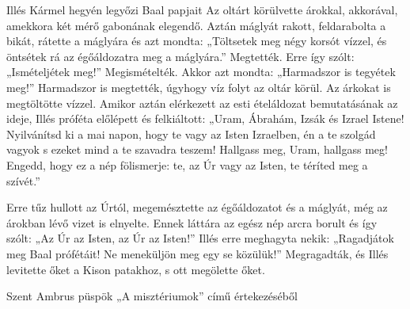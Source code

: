 \documentclass[twoside]{article}
\begin{document}
\begin{lectio}{Illés Kármel hegyén legyőzi Baal papjait}
Az oltárt körülvette árokkal, akkorával, amekkora két mérő gabonának elegendő. Aztán máglyát rakott, feldarabolta a bikát, rátette a máglyára és azt mondta: „Töltsetek meg négy korsót vízzel, és öntsétek rá az égőáldozatra meg a máglyára.” Megtették. Erre így szólt: „Ismételjétek meg!” Megismételték. Akkor azt mondta: „Harmadszor is tegyétek meg!” Harmadszor is megtették, úgyhogy víz folyt az oltár körül. Az árkokat is megtöltötte vízzel. Amikor aztán elérkezett az esti ételáldozat bemutatásának az ideje, Illés próféta előlépett és felkiáltott: „Uram, Ábrahám, Izsák és Izrael Istene! Nyilvánítsd ki a mai napon, hogy te vagy az Isten Izraelben, én a te szolgád vagyok s ezeket mind a te szavadra teszem! Hallgass meg, Uram, hallgass meg! Engedd, hogy ez a nép fölismerje: te, az Úr vagy az Isten, te téríted meg a szívét.”

Erre tűz hullott az Úrtól, megemésztette az égőáldozatot és a máglyát, még az árokban lévő vizet is elnyelte. Ennek láttára az egész nép arcra borult és így szólt: „Az Úr az Isten, az Úr az Isten!” Illés erre meghagyta nekik: „Ragadjátok meg Baal prófétáit! Ne meneküljön meg egy se közülük!” Megragadták, és Illés levitette őket a Kison patakhoz, s ott megölette őket.
\end{lectio}



Szent Ambrus püspök „A misztériumok” című értekezéséből

{\centering{}}
\end{document}
